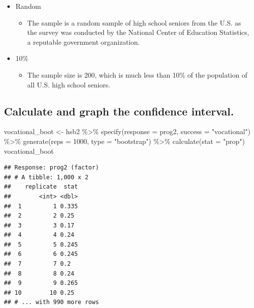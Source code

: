 \documentclass[
]{book}
\newenvironment{Shaded}{\begin{snugshade}}{\end{snugshade}}
\newcommand{\AttributeTok}[1]{\textcolor[rgb]{0.77,0.63,0.00}{#1}}
\newcommand{\DecValTok}[1]{\textcolor[rgb]{0.00,0.00,0.81}{#1}}
\newcommand{\FunctionTok}[1]{\textcolor[rgb]{0.00,0.00,0.00}{#1}}
\newcommand{\NormalTok}[1]{#1}
\newcommand{\OtherTok}[1]{\textcolor[rgb]{0.56,0.35,0.01}{#1}}
\newcommand{\SpecialCharTok}[1]{\textcolor[rgb]{0.00,0.00,0.00}{#1}}
\newcommand{\StringTok}[1]{\textcolor[rgb]{0.31,0.60,0.02}{#1}}
\providecommand{\tightlist}{%
  \setlength{\itemsep}{0pt}\setlength{\parskip}{0pt}}
\begin{document}
\begin{itemize}
\tightlist
\item
  Random

  \begin{itemize}
  \tightlist
  \item
    The sample is a random sample of high school seniors from the U.S. as the survey was conducted by the National Center of Education Statistics, a reputable government organization.
  \end{itemize}
\item
  10\%

  \begin{itemize}
  \tightlist
  \item
    The sample size is 200, which is much less than 10\% of the population of all U.S. high school seniors.
  \end{itemize}
\end{itemize}

\hypertarget{ci-ex-calcaulte}{%
\subsection{Calculate and graph the confidence interval.}\label{ci-ex-calcaulte}}

\begin{Shaded}
\begin{Highlighting}[]
\NormalTok{vocational\_boot }\OtherTok{\textless{}{-}}\NormalTok{ hsb2 }\SpecialCharTok{\%\textgreater{}\%}
    \FunctionTok{specify}\NormalTok{(}\AttributeTok{response =}\NormalTok{ prog2, }\AttributeTok{success =} \StringTok{"vocational"}\NormalTok{) }\SpecialCharTok{\%\textgreater{}\%}
    \FunctionTok{generate}\NormalTok{(}\AttributeTok{reps =} \DecValTok{1000}\NormalTok{, }\AttributeTok{type =} \StringTok{"bootstrap"}\NormalTok{) }\SpecialCharTok{\%\textgreater{}\%}
    \FunctionTok{calculate}\NormalTok{(}\AttributeTok{stat =} \StringTok{"prop"}\NormalTok{)}
\NormalTok{vocational\_boot}
\end{Highlighting}
\end{Shaded}

\begin{verbatim}
## Response: prog2 (factor)
## # A tibble: 1,000 x 2
##    replicate  stat
##        <int> <dbl>
##  1         1 0.335
##  2         2 0.25 
##  3         3 0.17 
##  4         4 0.24 
##  5         5 0.245
##  6         6 0.245
##  7         7 0.2  
##  8         8 0.24 
##  9         9 0.265
## 10        10 0.25 
## # ... with 990 more rows
\end{verbatim}
\end{document}
